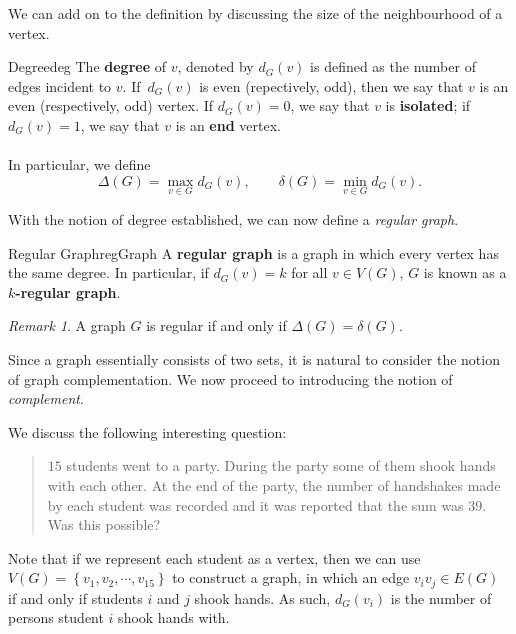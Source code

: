 \documentclass[math]{amznotes}
\makeatletter
\let\save@mathaccent\mathaccent
\newcommand*\if@single[3]{%
  \setbox0\hbox{${\mathaccent"0362{#1}}^H$}%
  \setbox2\hbox{${\mathaccent"0362{\kern0pt#1}}^H$}%
  \ifdim\ht0=\ht2 #3\else #2\fi
  }
\newcommand*\rel@kern[1]{\kern#1\dimexpr\macc@kerna}
\newcommand*\widebar[1]{\@ifnextchar^{{\wide@bar{#1}{0}}}{\wide@bar{#1}{1}}}
\newcommand*\wide@bar[2]{\if@single{#1}{\wide@bar@{#1}{#2}{1}}{\wide@bar@{#1}{#2}{2}}}
\newcommand*\wide@bar@[3]{%
  \begingroup
  \def\mathaccent##1##2{%
    \let\mathaccent\save@mathaccent
    \if#32 \let\macc@nucleus\first@char \fi
    \setbox\z@\hbox{$\macc@style{\macc@nucleus}_{}$}%
    \setbox\tw@\hbox{$\macc@style{\macc@nucleus}{}_{}$}%
    \dimen@\wd\tw@
    \advance\dimen@-\wd\z@
    \divide\dimen@ 3
    \@tempdima\wd\tw@
    \advance\@tempdima-\scriptspace
    \divide\@tempdima 10
    \advance\dimen@-\@tempdima
    \ifdim\dimen@>\z@ \dimen@0pt\fi
    \rel@kern{0.6}\kern-\dimen@
    \if#31
      \overline{\rel@kern{-0.6}\kern\dimen@\macc@nucleus\rel@kern{0.4}\kern\dimen@}%
      \advance\dimen@0.4\dimexpr\macc@kerna
      \let\final@kern#2%
      \ifdim\dimen@<\z@ \let\final@kern1\fi
      \if\final@kern1 \kern-\dimen@\fi
    \else
      \overline{\rel@kern{-0.6}\kern\dimen@#1}%
    \fi
  }%
  \macc@depth\@ne
  \let\math@bgroup\@empty \let\math@egroup\macc@set@skewchar
  \mathsurround\z@ \frozen@everymath{\mathgroup\macc@group\relax}%
  \macc@set@skewchar\relax
  \let\mathaccentV\macc@nested@a
  \if#31
    \macc@nested@a\relax111{#1}%
  \else
    \def\gobble@till@marker##1\endmarker{}%
    \futurelet\first@char\gobble@till@marker#1\endmarker
    \ifcat\noexpand\first@char A\else
      \def\first@char{}%
    \fi
    \macc@nested@a\relax111{\first@char}%
  \fi
  \endgroup
}
\theoremstyle{remark}
\newtheorem*{remark}{Remark}
\newcommand{\0}{\mathbf{0}}
\newcommand{\1}{\mathbf{1}}
\makeatother
\begin{document}
We can add on to the definition by discussing the size of the neighbourhood of a vertex.
\begin{dfnbox}{Degree}{deg}
    The {\color{red} \textbf{degree}} of $v$, denoted by $d_G(v)$ is defined as the number of edges incident to $v$. If~$d_G(v)$ is even (repectively, odd), then we say that $v$ is an even (respectively, odd) vertex. If $d_G(v) = 0$, we say that $v$ is {\color{red} \textbf{isolated}}; if $d_G(v) = 1$, we say that $v$ is an {\color{red} \textbf{end}} vertex. 
    \\\\
    In particular, we define
    \begin{equation*}
        \Delta(G) = \max_{v \in G}d_G(v), \qquad \delta(G) = \min_{v \in G}d_G(v).
    \end{equation*}
\end{dfnbox}
With the notion of degree established, we can now define a \textit{regular graph}.
\begin{dfnbox}{Regular Graph}{regGraph}
    A {\color{red} \textbf{regular graph}} is a graph in which every vertex has the same degree. In particular, if $d_G(v) = k$ for all $v \in V(G)$, $G$ is known as a {\color{red} \textbf{$k$-regular graph}}.
\end{dfnbox}
\begin{notebox}
    \begin{remark}
        A graph $G$ is regular if and only if $\Delta(G) = \delta(G)$.
    \end{remark}
\end{notebox}
Since a graph essentially consists of two sets, it is natural to consider the notion of graph complementation. We now proceed to introducing the notion of \textit{complement}.
We discuss the following interesting question:
\begin{quote}
    $15$ students went to a party. During the party some of them shook hands with each other. At the end of the party, the number of handshakes made by each student was recorded and it was reported that the sum was $39$. Was this possible?
\end{quote}
Note that if we represent each student as a vertex, then we can use $V(G) = \left\{v_1, v_2, \cdots, v_{15}\right\}$ to construct a graph, in which an edge $v_iv_j \in E(G)$ if and only if students $i$ and $j$ shook hands. As such, $d_G(v_i)$ is the number of persons student $i$ shook hands with.
\end{document}
